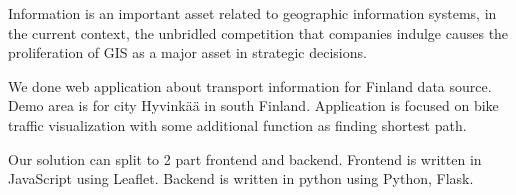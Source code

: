 

Information is an important asset related to geographic information systems, in the current context, the unbridled competition that companies indulge causes the proliferation of GIS as a major asset in strategic decisions.

We done web application about transport information for Finland data source. Demo area is for city Hyvinkää in south Finland. Application is focused on bike traffic visualization with some additional function as finding shortest path.

Our solution can split to 2 part frontend and backend. Frontend is written in JavaScript using Leaflet. Backend is written in python using Python, Flask.











